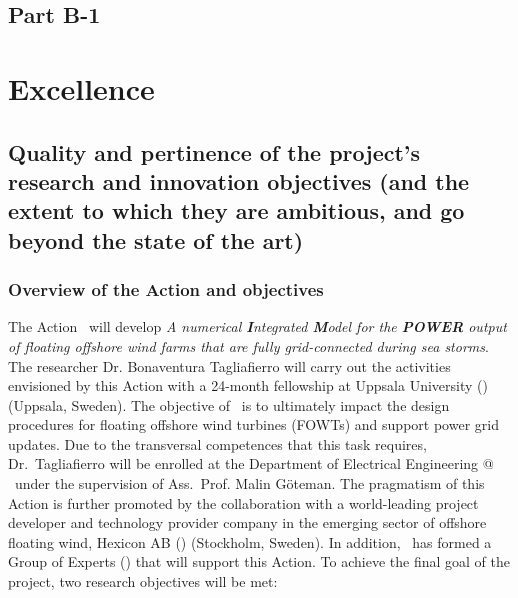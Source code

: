 {}
\vspace{-5ex}
\begin{center}
    {\section*{Part B-1}} 
\end{center}
\vspace{-2ex}


\section{Excellence }
\vspace{-6pt}

\subsection{Quality and pertinence of the project’s research and innovation objectives (and the extent to which they are ambitious, and go beyond the state of the art)}
\label{sec:quality}


\subsubsection*{Overview of the Action and objectives}\vspace{-1ex}

The Action \nameAction\ will develop \emph{A numerical \textbf{I}ntegrated \textbf{M}odel for the \textbf{POWER} output of floating offshore wind farms that are fully grid-connected during sea storms}. The researcher Dr. Bonaventura Tagliafierro will carry out the activities envisioned by this Action with a 24-month fellowship at Uppsala University (\UU) (Uppsala, Sweden). The objective of \nameAction\ is to ultimately impact the design procedures for floating offshore wind turbines (FOWTs) and support power grid updates. Due to the transversal competences that this task requires, Dr.~Tagliafierro will be enrolled at the Department of Electrical Engineering @ \UU\ under the supervision of Ass.~Prof. Malin Göteman. The pragmatism of this Action is further promoted by the collaboration with a world-leading project developer and technology provider company in the emerging sector of offshore floating wind, Hexicon AB (\Hexicon) (Stockholm, Sweden). In addition, \UU\ has formed a Group of Experts (\Gop) that will support this Action. To achieve the final goal of the project, two research objectives will be met:


